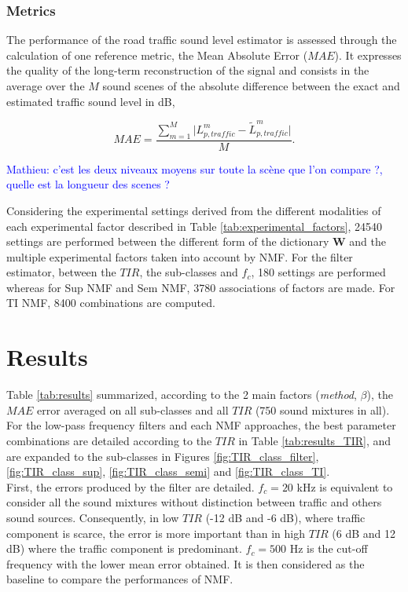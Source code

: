 \documentclass[twocolumn,a4paper,10pt]{article}
\newcommand{\ml}[1]{\textcolor{blue}{ Mathieu: #1}}
\begin{document}
\subsubsection{Metrics}

The performance of the road traffic sound level estimator is assessed through the calculation of one reference metric, the Mean Absolute Error ($MAE$). It expresses the quality of the long-term reconstruction of the signal and consists in the average over the $M$ sound scenes of the absolute difference between the exact and estimated traffic sound level in dB,

\begin{equation}
MAE = \frac{\sum_{m = 1}^M\vert L^m_{p,traffic}-\tilde{L}^m_{p,traffic} \vert}{M}.
\end{equation}

\ml{c'est les deux niveaux moyens sur toute la scène que l'on compare ?, quelle est la longueur des scenes ?}

Considering the experimental settings derived from the different modalities of each experimental factor described in Table \ref{tab:experimental_factors}, 24540 settings are performed between the different form of the dictionary $\mathbf{W}$ and the multiple experimental factors taken into account by NMF. For the filter estimator, between the $TIR$, the sub-classes and $f_c$, 180 settings are performed whereas for Sup NMF and Sem NMF, 3780 associations of factors are made. For TI NMF, 8400 combinations are computed.

\section{Results}\label{part:results}

Table \ref{tab:results} summarized, according to the 2 main factors (\textit{method}, $\beta$), the $MAE$ error averaged on all sub-classes and all $TIR$ (750 sound mixtures in all). For the low-pass frequency filters and each NMF approaches, the best parameter combinations are detailed according to the $TIR$ in Table \ref{tab:results_TIR},  and are expanded to the sub-classes in Figures \ref{fig:TIR_class_filter}, \ref{fig:TIR_class_sup}, \ref{fig:TIR_class_semi} and \ref{fig:TIR_class_TI}. \\

First, the errors produced by the filter are detailed. $f_c = 20 $ kHz is equivalent to consider all the sound mixtures without distinction between traffic and others sound sources. Consequently, in low $TIR$ (-12 dB and -6 dB), where traffic component is scarce, the error is more important than in high $TIR$ (6 dB and 12 dB) where the traffic component is predominant. $f_c = 500$ Hz is the cut-off frequency with the lower mean error obtained. It is then considered as the baseline to compare the performances of NMF.
\end{document}
